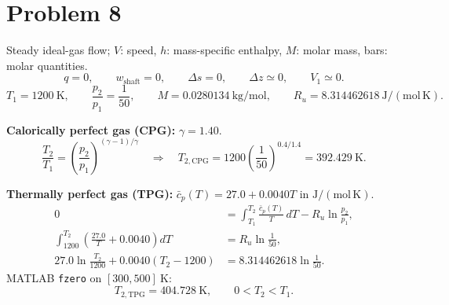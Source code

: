 \section*{Problem 8}

Steady ideal-gas flow; $V$: speed, $h$: mass-specific enthalpy,
$M$: molar mass, bars: molar quantities.
\[
q=0,\qquad w_{\mathrm{shaft}}=0,\qquad \Delta s=0,\qquad
\Delta z\simeq0,\qquad V_1\simeq0.
\]
\[
T_1=1200\ \mathrm{K},\qquad \frac{p_2}{p_1}=\frac{1}{50},\qquad
M=0.0280134\ \mathrm{kg/mol},\qquad
R_u=8.314462618\ \mathrm{J/(mol\,K)}.
\]

\textbf{Calorically perfect gas (CPG):} $\gamma=1.40$.
\[
\frac{T_2}{T_1}=\left(\frac{p_2}{p_1}\right)^{(\gamma-1)/\gamma}
\quad\Longrightarrow\quad
\boxed{T_{2,\mathrm{CPG}}=1200\left(\frac{1}{50}\right)^{0.4/1.4}
=392.429\ \mathrm{K}}.
\]

\textbf{Thermally perfect gas (TPG):} $\bar c_p(T)=27.0+0.0040T$ in $\mathrm{J/(mol\,K)}$.
\begin{align*}
0&=\int_{T_1}^{T_2}\frac{\bar c_p(T)}{T}\,dT-R_u\ln\frac{p_2}{p_1},\\
\int_{1200}^{T_2}\left(\frac{27.0}{T}+0.0040\right)dT
&=R_u\ln\frac{1}{50},\\
27.0\ln\frac{T_2}{1200}+0.0040(T_2-1200)
&=8.314462618\ln\frac{1}{50}.
\end{align*}
MATLAB \texttt{fzero} on $[300,500]\ \mathrm{K}$:
\[
\boxed{T_{2,\mathrm{TPG}}=404.728\ \mathrm{K}},\qquad 0<T_2<T_1.
\]

